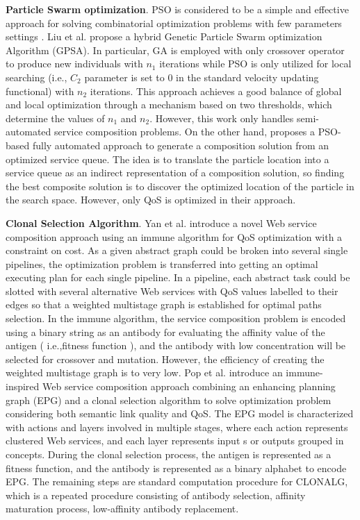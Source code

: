 \textbf{Particle Swarm optimization}.
PSO is considered to be a simple and effective approach for solving combinatorial optimization problems with few parameters settings \cite{long2009environment}. Liu et al. \cite{liu2007hybrid} propose a hybrid Genetic Particle Swarm optimization Algorithm (GPSA). In particular, GA is employed with only crossover operator to produce new individuals with $n_1$ iterations while PSO is only utilized for local searching (i.e., $C_2$ parameter is set to 0 in the standard velocity updating functional) with $n_2$ iterations. This approach achieves a good balance of global and local optimization through a  mechanism based on two thresholds, which determine the values of $n_1$ and $n_2$. However, this work \cite{liu2007hybrid} only handles semi-automated service composition problems. On the other hand, \cite{da2016particle} proposes a PSO-based fully automated approach to generate a composition solution from an optimized service queue. The idea is to translate the particle location into a service queue as an indirect representation of a composition solution, so finding the best composite solution is to discover the optimized location of the particle in the search space. However, only QoS is optimized in their approach.

\textbf{Clonal Selection Algorithm}.
Yan et al. \cite{yan2006immune} introduce a novel Web service composition approach using an immune algorithm for QoS optimization with a constraint on cost. As a given abstract graph could be broken into several single pipelines, the optimization problem is transferred into getting an optimal executing plan for each single pipeline. In a pipeline, each abstract task could be slotted with several alternative Web services with QoS values labelled to their edges so that a weighted multistage graph is established for optimal paths selection. In the immune algorithm, the service composition problem is encoded using a binary string as an antibody for evaluating the affinity value of the antigen ( i.e.,fitness function ), and the antibody with low concentration will be selected for crossover and mutation. However, the efficiency of creating the weighted multistage graph is to very low. Pop et al. \cite{pop2009immune} introduce an immune-inspired Web service composition approach combining an enhancing planning graph (EPG) and a clonal selection algorithm to solve optimization problem considering both semantic link quality and QoS.  The EPG model is characterized with actions and layers involved in multiple stages, where each action represents clustered Web services, and each layer represents input s or outputs grouped in concepts. During the clonal selection process, the antigen is represented as a fitness function, and the antibody is represented as a binary alphabet to encode EPG. The remaining steps are standard computation procedure for CLONALG, which is a repeated procedure consisting of antibody selection, affinity maturation process, low-affinity antibody replacement.

